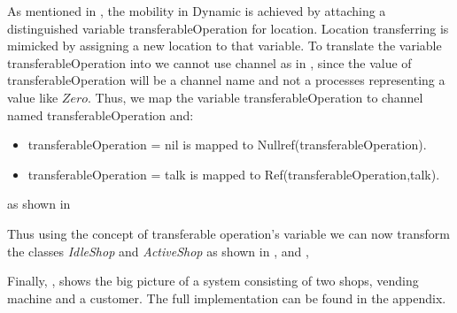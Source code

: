 As mentioned in , the mobility in Dynamic \oz{} is achieved
by attaching a distinguished variable transferableOperation for location. Location transferring
is mimicked by assigning a new location to that variable. To translate the variable transferableOperation into \picalc{} we cannot use \picalc{} channel as in , since the value of transferableOperation will be a channel name and not a processes representing a value like $Zero$. Thus, we map the variable transferableOperation to channel named transferableOperation and:

\begin{itemize}
\item transferableOperation = nil is mapped to Nullref(transferableOperation).

\item transferableOperation = talk is mapped to Ref(transferableOperation,talk).
\end{itemize}
as shown in  

Thus using the concept of transferable operation's variable we can now transform the classes \textit{IdleShop} and \textit{ActiveShop} as shown in ,  and , 



Finally, ,  shows the big picture of a system consisting of two shops, vending machine and a customer. The full implementation can be found in the appendix.
